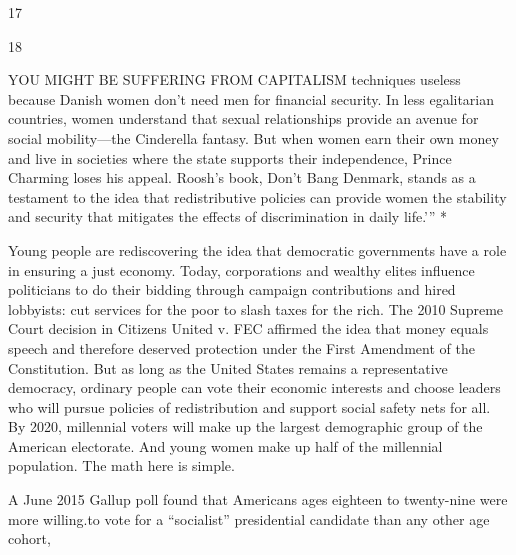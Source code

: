  \par 
17
 \par 
18
 \par 
YOU MIGHT BE SUFFERING FROM CAPITALISM techniques useless because Danish women don't need men for financial security. In less egalitarian countries, women understand that sexual relationships provide an avenue for social mobility—the Cinderella fantasy. But when women earn their own money and live in societies where the state supports their independence, Prince Charming loses his appeal. Roosh’s book, Don’t Bang Denmark, stands as a testament to the idea that redistributive policies can provide women the stability and security that mitigates the effects of discrimination in daily life.'” *
 \par 
Young people are rediscovering the idea that democratic governments have a role in ensuring a just economy. Today, corporations and wealthy elites influence politicians to do their bidding through campaign contributions and hired lobbyists: cut services for the poor to slash taxes for the rich. The 2010 Supreme Court decision in Citizens United v. FEC affirmed the idea that money equals speech and therefore deserved protection under the First Amendment of the Constitution. But as long as the United States remains a representative democracy, ordinary people can vote their economic interests and choose leaders who will pursue policies of redistribution and support social safety nets for all. By 2020, millennial voters will make up the largest demographic group of the American electorate. And young women make up half of the millennial population. The math here is simple.
 \par 
A June 2015 Gallup poll found that Americans ages eighteen to twenty-nine were more willing.to vote for a “socialist” presidential candidate than any other age cohort,
 \par 
